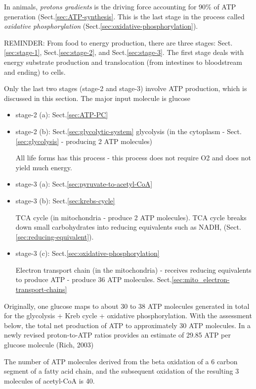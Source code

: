 In animals, {\it protons gradients} is the driving force accounting for 90\% of
ATP generation (Sect.\ref{sec:ATP-synthesis}. This is the last stage in the
process called {\it oxidative phosphorylation}
(Sect.\ref{sec:oxidative-phosphorylation}).

\begin{mdframed}
REMINDER: From food to energy production, there are three stages: Sect.\ref{sec:stage-1},
Sect.\ref{sec:stage-2}, and Sect.\ref{sec:stage-3}. The first stage deals with
energy substrate production and translocation (from intestines to bloodstream
and ending) to cells. 

Only the last two stages (stage-2 and stage-3) involve ATP production, which is
discussed in this section. The major input molecule is glucose
\begin{itemize}
  \item stage-2 (a): Sect.\ref{sec:ATP-PC}
  \item stage-2 (b): Sect.\ref{sec:glycolytic-system} glycolysis (in the
  cytoplasm - Sect.\ref{sec:glycolysis} - producing 2 ATP molecules)

All life forms has this process - this process does not require O2 and does not
yield much energy.

  \item stage-3 (a): Sect.\ref{sec:pyruvate-to-acetyl-CoA}
  \item stage-3 (b): Sect.\ref{sec:krebs-cycle}

TCA cycle (in mitochondria - produce 2 ATP molecules). TCA cycle breaks down
small carbohydrates into reducing equivalents such as NADH, 
(Sect.\ref{sec:reducing-equivalent}).

  \item stage-3 (c): Sect.\ref{sec:oxidative-phosphorylation}  

Electron transport chain (in the mitochondria) - receives reducing equivalents
to produce ATP - produce 36 ATP molecules.
Sect.\ref{sec:mito_electron-transport-chains}

\end{itemize}
\end{mdframed}


\begin{mdframed}

Originally, one glucose maps to about 30 to 38 ATP molecules generated in total
for the glycolysis + Kreb cycle + oxidative phosphorylation.
With the assessment below, the total net production of ATP to approximately 30
ATP molecules. In a newly revised proton-to-ATP ratios provides an estimate of
29.85 ATP per glucose molecule (Rich, 2003)

The number of ATP molecules derived from the beta oxidation of a 6 carbon
segment of a fatty acid chain, and the subsequent oxidation of the resulting 3
molecules of acetyl-CoA is 40.
\end{mdframed}


